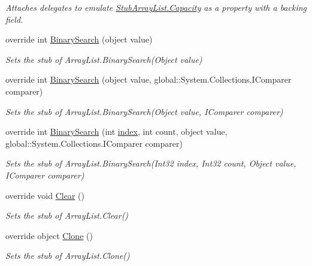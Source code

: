 \begin{DoxyCompactItemize}
\begin{DoxyCompactList}\small\item\em Attaches delegates to emulate \hyperlink{class_system_1_1_collections_1_1_fakes_1_1_stub_array_list_a7c50402e6dd03b1627e1b56a29aa2ed0}{Stub\-Array\-List.\-Capacity} as a property with a backing field.\end{DoxyCompactList}\item 
override int \hyperlink{class_system_1_1_collections_1_1_fakes_1_1_stub_array_list_a0e82333155efd7753e6334aa6831ceb3}{Binary\-Search} (object value)
\begin{DoxyCompactList}\small\item\em Sets the stub of Array\-List.\-Binary\-Search(\-Object value)\end{DoxyCompactList}\item 
override int \hyperlink{class_system_1_1_collections_1_1_fakes_1_1_stub_array_list_a49454b6cf11504b7cbfcf968d6a71b1c}{Binary\-Search} (object value, global\-::\-System.\-Collections.\-I\-Comparer comparer)
\begin{DoxyCompactList}\small\item\em Sets the stub of Array\-List.\-Binary\-Search(\-Object value, I\-Comparer comparer)\end{DoxyCompactList}\item 
override int \hyperlink{class_system_1_1_collections_1_1_fakes_1_1_stub_array_list_a531f84f5b04db2ee95fde9fd3ef2ca63}{Binary\-Search} (int \hyperlink{jquery-1_810_82-vsdoc_8js_a75bb12d1f23302a9eea93a6d89d0193e}{index}, int count, object value, global\-::\-System.\-Collections.\-I\-Comparer comparer)
\begin{DoxyCompactList}\small\item\em Sets the stub of Array\-List.\-Binary\-Search(\-Int32 index, Int32 count, Object value, I\-Comparer comparer)\end{DoxyCompactList}\item 
override void \hyperlink{class_system_1_1_collections_1_1_fakes_1_1_stub_array_list_ab854b45b21ecf31d4a149ce369e8c507}{Clear} ()
\begin{DoxyCompactList}\small\item\em Sets the stub of Array\-List.\-Clear()\end{DoxyCompactList}\item 
override object \hyperlink{class_system_1_1_collections_1_1_fakes_1_1_stub_array_list_a644763a7555d419b3d17351cd85a5398}{Clone} ()
\begin{DoxyCompactList}\small\item\em Sets the stub of Array\-List.\-Clone()\end{DoxyCompactList}\item 

\end{DoxyCompactItemize}
